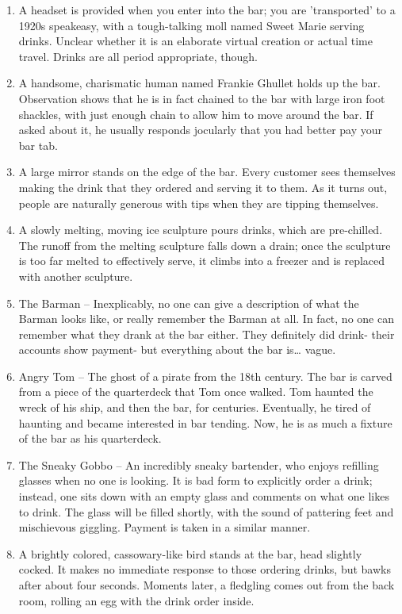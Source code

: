 \documentclass{article}
\begin{document}
\begin{enumerate}
	\item A headset is provided when you enter into the bar; you are 'transported' to a 1920s speakeasy, with a tough-talking moll named Sweet Marie serving drinks. Unclear whether it is an elaborate virtual creation or actual time travel. Drinks are all period appropriate, though.
	\item A handsome, charismatic human named Frankie Ghullet holds up the bar. Observation shows that he is in fact chained to the bar with large iron foot shackles, with just enough chain to allow him to move around the bar. If asked about it, he usually responds jocularly that you had better pay your bar tab.
	\item A large mirror stands on the edge of the bar. Every customer sees themselves making the drink that they ordered and serving it to them. As it turns out, people are naturally generous with tips when they are tipping themselves.
	\item A slowly melting, moving ice sculpture pours drinks, which are pre-chilled. The runoff from the melting sculpture falls down a drain; once the sculpture is too far melted to effectively serve, it climbs into a freezer and is replaced with another sculpture.
	\item The Barman – Inexplicably, no one can give a description of what the Barman looks like, or really remember the Barman at all. In fact, no one can remember what they drank at the bar either. They definitely did drink- their accounts show payment- but everything about the bar is… vague.
	\item Angry Tom – The ghost of a pirate from the 18th century. The bar is carved from a piece of the quarterdeck that Tom once walked. Tom haunted the wreck of his ship, and then the bar, for centuries. Eventually, he tired of haunting and became interested in bar tending. Now, he is as much a fixture of the bar as his quarterdeck.
	\item The Sneaky Gobbo – An incredibly sneaky bartender, who enjoys refilling glasses when no one is looking. It is bad form to explicitly order a drink; instead, one sits down with an empty glass and comments on what one likes to drink. The glass will be filled shortly, with the sound of pattering feet and mischievous giggling. Payment is taken in a similar manner.
	\item A brightly colored, cassowary-like bird stands at the bar, head slightly cocked. It makes no immediate response to those ordering drinks, but bawks after about four seconds. Moments later, a fledgling comes out from the back room, rolling an egg with the drink order inside.

\end{enumerate}
\end{document}
